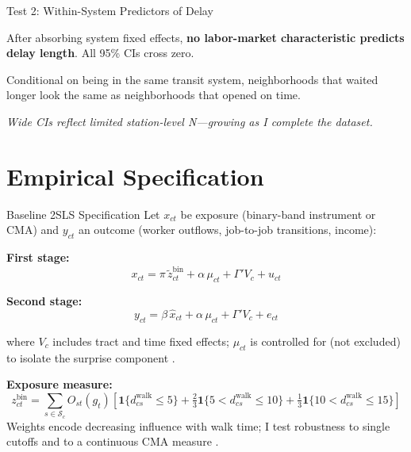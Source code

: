 \documentclass{beamer}
\begin{document}
\begin{frame}{Test 2: Within-System Predictors of Delay}
\begin{center}
\end{center}
\small
After absorbing system fixed effects, \textbf{no labor-market characteristic predicts
delay length}. All 95\% CIs cross zero.

\medskip
Conditional on being in the same transit system, neighborhoods that waited longer
look the same as neighborhoods that opened on time.

\medskip
\textit{Wide CIs reflect limited station-level N---growing as I complete the dataset.}
\end{frame}

\section{Empirical Specification}

\begin{frame}{Baseline 2SLS Specification}
\small
Let $x_{ct}$ be exposure (binary-band instrument or CMA) and $y_{ct}$ an outcome
(worker outflows, job-to-job transitions, income):

\medskip
\textbf{First stage:}
\[
x_{ct} = \pi\,\tilde{z}^{\text{bin}}_{ct} + \alpha\,\mu_{ct} + \Gamma' V_c + u_{ct}
\]

\textbf{Second stage:}
\[
y_{ct} = \beta\,\hat{x}_{ct} + \alpha\,\mu_{ct} + \Gamma' V_c + e_{ct}
\]

where $V_c$ includes tract and time fixed effects; $\mu_{ct}$ is controlled for
(not excluded) to isolate the surprise component \parencite{borusyak_nonrandom_2023}.

\medskip
\textbf{Exposure measure:}
\[
z^{\text{bin}}_{ct} = \sum_{s \in \mathcal{S}_c} O_{st}(g_t)\!\left[
\mathbf{1}\{d^{\text{walk}}_{cs} \le 5\}
+ \tfrac{2}{3}\mathbf{1}\{5 < d^{\text{walk}}_{cs} \le 10\}
+ \tfrac{1}{3}\mathbf{1}\{10 < d^{\text{walk}}_{cs} \le 15\}
\right]
\]
Weights encode decreasing influence with walk time; I test robustness to single cutoffs
and to a continuous CMA measure \parencite{eaton_technology_2002, donaldson_railroads_2016}.
\end{frame}
\end{document}
